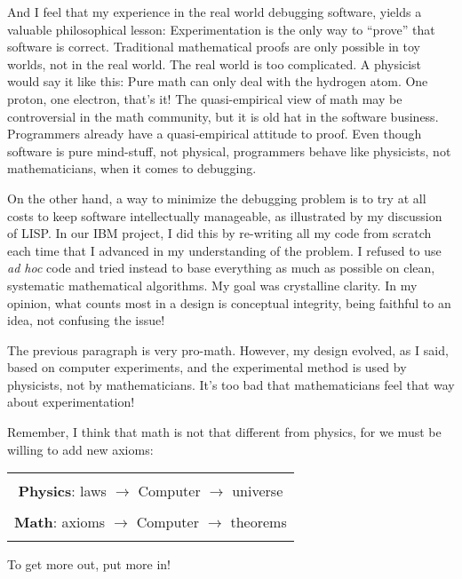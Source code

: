 \documentclass[12pt]{book}
\begin{document}
And I feel that my experience in the real world debugging software, yields 
a valuable philosophical lesson:
Experimentation is the only way to ``prove'' that software is correct.
Traditional mathematical proofs are only possible in toy worlds, not in the real world.
The real world is too complicated.
A physicist would say it like this: Pure math can only deal with the hydrogen atom.
One proton, one electron, that's it!
The quasi-empirical view of math may be controversial in the math community, but it is old hat
in the software business.
Programmers already have a quasi-empirical attitude to proof.
Even though software is pure mind-stuff, not physical,
programmers behave like physicists, not mathematicians, when it comes to debugging.
 
On the other hand, a way to minimize the debugging problem is to try at all costs to keep software
intellectually manageable, as illustrated by my discussion of LISP.
In our IBM project, I did this by re-writing all my code
from scratch each time that I advanced in my understanding of the problem.
I refused to use \emph{ad hoc} code and tried instead to base everything 
as much as possible on clean, systematic mathematical algorithms.
My goal was crystalline clarity.
In my opinion,
what counts most in a design is conceptual integrity, being faithful to an idea, not confusing
the issue!
 
The previous paragraph is very pro-math. However, my design evolved,
as I said, based on computer experiments,
and the experimental method is used by physicists, not by mathematicians.
It's too bad that mathematicians feel that way about experimentation!
 
Remember, I think that
math is not that different from physics, for we must be willing to add new axioms:
\begin{center}
\begin{tabular}{|c|}
\hline
\\
   \textbf{\large Physics}: laws $\rightarrow$ {\large Computer} $\rightarrow$ universe
\\ \\
   \textbf{\large Math}: axioms $\rightarrow$  {\large Computer} $\rightarrow$ theorems
\\
\\
\hline
\end{tabular}
\end{center}
To get more out, put more in!
 
\end{document}
